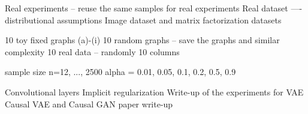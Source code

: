 Real experiments -- reuse the same samples for real experiments
Real dataset —- distributional assumptions
Image dataset and matrix factorization datasets

10 toy fixed graphs (a)-(i)
10 random graphs -- save the graphs and similar complexity
10 real data -- randomly 10 columns

sample size n=12, ..., 2500
alpha = 0.01, 0.05, 0.1, 0.2, 0.5, 0.9

Convolutional layers
Implicit regularization
Write-up of the experiments for VAE
Causal VAE and Causal GAN paper write-up
